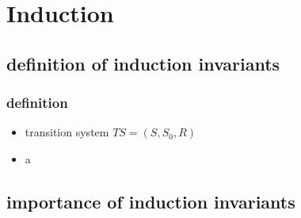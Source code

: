 \section{Induction}
\subsection{definition of induction invariants}
\begin{frame}
    \frametitle{definition}
    \begin{itemize}
        \item transition system $TS=(S,S_{0},R)$
        \item a
    \end{itemize}
\end{frame}
\subsection{importance of induction invariants}
